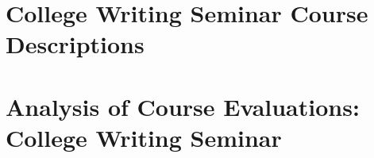 \documentclass[../../main.tex]{subfiles}
\begin{document}
\begin{flushleft}

\end{flushleft}

\section{College Writing Seminar Course Descriptions}
\label{sec:writing}

\begin{flushleft}

\end{flushleft}

\section{Analysis of Course Evaluations: College Writing Seminar}
\label{sec:writing_eval}

\begin{flushleft}

\end{flushleft}

%
%
\end{document}
